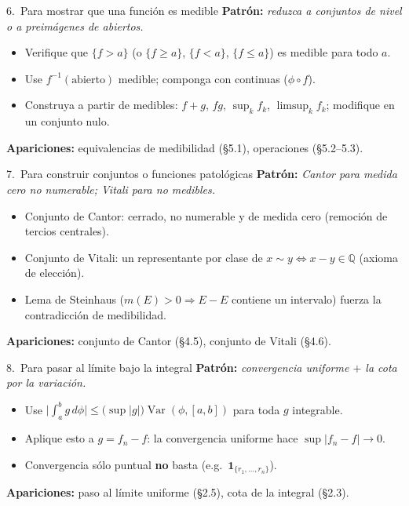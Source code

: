 \documentclass[11pt,twoside]{article}
\DeclareMathOperator{\Var}{Var}
\newcommand{\Q}{\mathbb{Q}}
\newcommand{\ind}{\mathbf{1}}                 %
\begin{document}
\begin{strategybox}{6.\ Para mostrar que una funci\'on es medible}
\textbf{Patr\'on:} \textit{reduzca a conjuntos de nivel o a preim\'agenes de abiertos.}
\begin{itemize}[leftmargin=1.5em]
\item Verifique que $\{f > a\}$ (o $\{f \geq a\}$, $\{f < a\}$, $\{f \leq a\}$) es medible para todo $a$.
\item Use $f^{-1}(\text{abierto})$ medible; componga con continuas ($\phi \circ f$).
\item Construya a partir de medibles: $f + g$, $fg$, $\sup_{k} f_{k}$, $\limsup_{k} f_{k}$; modifique en un conjunto nulo.
\end{itemize}
\textbf{Apariciones:} equivalencias de medibilidad (§5.1), operaciones (§5.2--5.3).
\end{strategybox}

\begin{strategybox}{7.\ Para construir conjuntos o funciones patol\'ogicas}
\textbf{Patr\'on:} \textit{Cantor para medida cero no numerable; Vitali para no medibles.}
\begin{itemize}[leftmargin=1.5em]
\item Conjunto de Cantor: cerrado, no numerable y de medida cero (remoci\'on de tercios centrales).
\item Conjunto de Vitali: un representante por clase de $x \sim y \iff x - y \in \Q$ (axioma de elecci\'on).
\item Lema de Steinhaus ($m(E) > 0 \Rightarrow E - E$ contiene un intervalo) fuerza la contradicci\'on de medibilidad.
\end{itemize}
\textbf{Apariciones:} conjunto de Cantor (§4.5), conjunto de Vitali (§4.6).
\end{strategybox}

\begin{strategybox}{8.\ Para pasar al l\'imite bajo la integral}
\textbf{Patr\'on:} \textit{convergencia uniforme $+$ la cota por la variaci\'on.}
\begin{itemize}[leftmargin=1.5em]
\item Use $\big|\int_{a}^{b} g\,d\phi\big| \leq \big(\sup|g|\big)\Var(\phi, [a,b])$ para toda $g$ integrable.
\item Aplique esto a $g = f_{n} - f$: la convergencia uniforme hace $\sup|f_{n} - f| \to 0$.
\item Convergencia s\'olo puntual \textbf{no} basta (e.g.\ $\ind_{\{r_{1}, \dots, r_{n}\}}$).
\end{itemize}
\textbf{Apariciones:} paso al l\'imite uniforme (§2.5), cota de la integral (§2.3).
\end{strategybox}
\newpage
\end{document}
